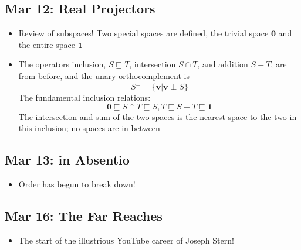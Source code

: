 \documentclass[10pt, oneside]{article}
\let\subspeq\sqsubseteq
\renewcommand{\vec}[1]{\mathbf{#1}}
\begin{document}
\subsection{Mar 12: Real Projectors}
\begin{itemize}
    \item Review of subspaces! Two special spaces are defined, the trivial space $\vec{0}$ and the entire space $\vec{1}$
    \item The operators inclusion, $S \subspeq T$, intersection $S \cap T$, and addition $S + T$, are from before, and the unary orthocomplement is
        \[S^\perp = \{\vec{v} | \vec{v} \perp S\}\]
        The fundamental inclusion relations:
        \[\vec{0} \subspeq S \cap T \subspeq S,T \subspeq S + T \subspeq \vec{1}\]
        The intersection and sum of the two spaces is the nearest space to the two in this inclusion; no spaces are in between
\end{itemize}

\subsection{Mar 13: in Absentio}
\begin{itemize}
    \item Order has begun to break down!
\end{itemize}

\subsection{Mar 16: The Far Reaches}
\begin{itemize}
    \item The start of the illustrious   YouTube career of Joseph Stern!
\end{itemize}
\end{document}
